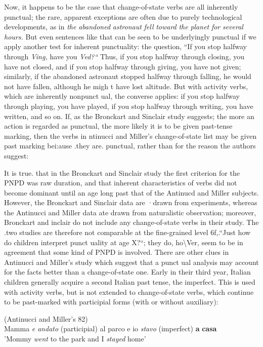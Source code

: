 Now, it happens to be the case that change-of-state verbs are all inherently punctual; the rare, apparent exceptions are often due to purely technological developments, as in \textit{the} \textit{abandoned} \textit{astronaut} \textit{fell} \textit{toward} \textit{the} \textit{planet} \textit{for} \textit{several} \textit{hours.} But even sentences like that can be
seen to be underlyingly punctual if we apply another test for inherent punctuality: the question, ``If you stop halfway through \textit{Vi}\textit{n}\textit{g,} have you \textit{Ved?``} Thus, if you stop halfway through closing, you have not closed, and if you stop halfway through giving, you have not given; similarly, if the abandoned astronaut stopped halfway through falling, he would not have fallen, although he migh t have lost altitude. But with activity verbs, which are inherently nonpunct ual, the converse applies: if you stop halfway through playing, you have played, if you stop half\-way through writing, you have written, and so on. If, as the Bronckart
and Sinclair study suggests; the more an action is regarded as punctual,
the more likely it is to be given past-tense marking, then the verbs in
ntinucci and Miller's change-of-state list may be given past marking bei:ause .they are. punctual, rather than for the reason the authors suggest:


It is true. that in the Bronckart and Sinclair study the first cri\-terion for the PNPD was raw duration, and that inherent characteristics
of verbs did not become dominant until an age long past that of the
Antinucd and Miller subjects. However, the Bronckart and Sinclair data are ·drawn from experiments, whereas the Antinucci and Miller data ate drawn from naturalistic observation; moreover, Bronckart and inclair do not include any change-of-state verbs in their study. The .two studies are therefore not comparable at the fine-grained level 6f,.``Just how do children interpret punct uality at age X?``; they do, ho{\textbackslash}Ver, seem to be in agreement that some kind of PNPD is involved.
There are other clues in Antinucci and Miller's study which
suggest that a punct ual analysis may account for the facts better than a change-of-state one. Early in their third year, Italian children generally acquire a second Italian past tense, the imperfect. This is used with activity verbs, but is not extended to change-of-state verbs, which continue to be past-marked with participial forms (with or without auxiliary):

\ea\label{ex:22}
 (Antinucci and Miller's 82)\\
  Mamma \textit{e} \textit{andato} (participial) al parco e io \textit{stavo} (imperfect) \textbf{a} \textbf{casa}\\
\glt'Mommy \textit{went} to the park and I \textit{stayed} home'
\z







